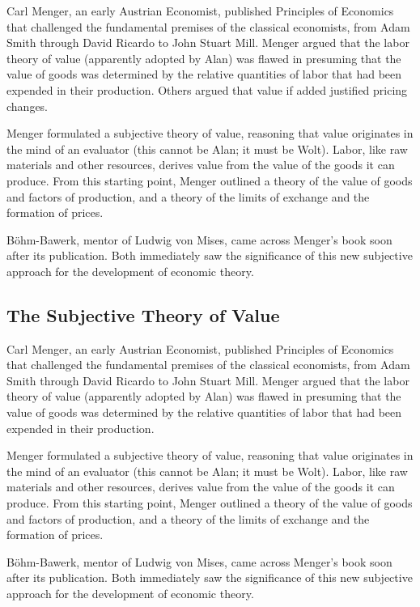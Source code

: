 Carl Menger, an early Austrian Economist, published Principles of Economics that challenged the fundamental premises of the classical economists, from Adam Smith through David Ricardo to John Stuart Mill. Menger argued that the labor theory of value (apparently adopted by Alan) was flawed in presuming that the value of goods was determined by the relative quantities of labor that had been expended in their production. Others argued that value if added justified pricing changes.

Menger formulated a subjective theory of value, reasoning that value originates in the mind of an evaluator (this cannot be Alan; it must be Wolt). Labor, like raw materials and other resources, derives value from the value of the goods it can produce. From this starting point, Menger outlined a theory of the value of goods and factors of production, and a theory of the limits of exchange and the formation of prices.

Böhm-Bawerk, mentor of Ludwig von Mises, came across Menger’s book soon after its publication. Both immediately saw the significance of this new subjective approach for the development of economic theory.

\subsection{The Subjective Theory of Value}

Carl Menger, an early Austrian Economist, published Principles of Economics that challenged the fundamental premises of the classical economists, from Adam Smith through David Ricardo to John Stuart Mill. Menger argued that the labor theory of value (apparently adopted by Alan) was flawed in presuming that the value of goods was determined by the relative quantities of labor that had been expended in their production.

Menger formulated a subjective theory of value, reasoning that value originates in the mind of an evaluator (this cannot be Alan; it must be Wolt). Labor, like raw materials and other resources, derives value from the value of the goods it can produce. From this starting point, Menger outlined a theory of the value of goods and factors of production, and a theory of the limits of exchange and the formation of prices.

Böhm-Bawerk, mentor of Ludwig von Mises, came across Menger’s book soon after its publication. Both immediately saw the significance of this new subjective approach for the development of economic theory.

